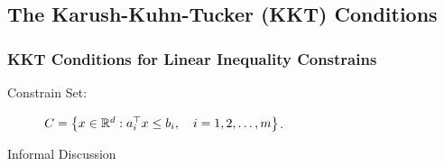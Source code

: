 \subsection{The Karush-Kuhn-Tucker (KKT) Conditions}
\subsubsection{KKT Conditions for Linear Inequality Constrains}
\begin{description}
	\item[Constrain Set:] $C=\qty{x\in{\mathbb{R}}^d:a_i^\top x\leq b_i,\quad i=1,2,\dots,m}$.
\end{description}
\begin{eg}{Informal Discussion}
		
\end{eg}


